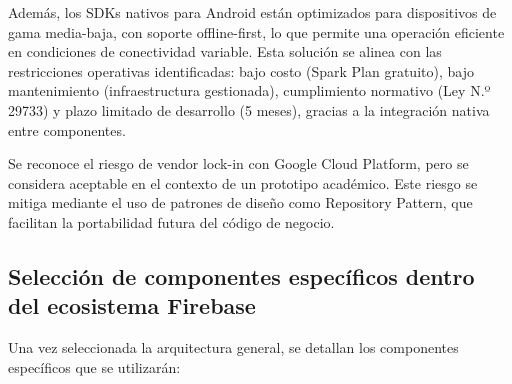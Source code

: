Además, los SDKs nativos para Android están optimizados para dispositivos de gama media-baja, con soporte offline-first, lo que permite una operación eficiente en condiciones de conectividad variable. Esta solución se alinea con las restricciones operativas identificadas: bajo costo (Spark Plan gratuito), bajo mantenimiento (infraestructura gestionada), cumplimiento normativo (Ley N.º 29733) y plazo limitado de desarrollo (5 meses), gracias a la integración nativa entre componentes.

Se reconoce el riesgo de vendor lock-in con Google Cloud Platform, pero se considera aceptable en el contexto de un prototipo académico. Este riesgo se mitiga mediante el uso de patrones de diseño como Repository Pattern, que facilitan la portabilidad futura del código de negocio.

\subsection{Selección de componentes específicos dentro del ecosistema Firebase}

Una vez seleccionada la arquitectura general, se detallan los componentes específicos que se utilizarán:


